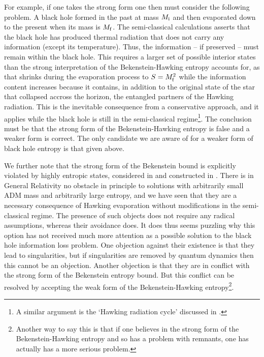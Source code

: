 \documentclass[12pt]{article}
\begin{document}
For example, if  one takes the strong form one then must consider the following problem.  A black hole formed in the past at mass $M_{\rm i}$ and then evaporated down to the present when its mass is $M_{\rm f}$. The semi-classical calculations asserts that the black hole has produced thermal radiation 
that does not carry any information (except its temperature). Thus, the 
information -- if preserved -- must remain within the black hole.  This requires a  larger set of possible interior states than the strong 
interpretation of the Bekenstein-Hawking entropy accounts for, as that  shrinks during the evaporation process to $S = M_{\rm f}^2$ while
the information content increases because it contains, in addition to the original state of the star that collapsed accross the horizon, the entangled partners of the Hawking radiation.  This is the inevitable consequence from a conservative
approach, and it applies while the black hole is still in the semi-classical regime\footnote{A similar argument is the `Hawking radiation cycle' discussed in \cite{Marolf:2008tx}.}.  The conclusion must be that the strong form of the Bekenstein-Hawking entropy is false and a weaker form is correct.  The only candidate we are aware of for a weaker form of black hole entropy is that given above. 

We further note that the strong form of the Bekenstein bound is explicitly violated by highly entropic states, considered in \cite{Marolf:2003wu} and  constructed in \cite{Hsu:2007dr}. There is in General Relativity no obstacle in
principle to solutions with arbitrarily small ADM mass and arbitrarily large entropy, and we have seen that they are
a necessary consequence of Hawking evaporation without modifications in the semi-classical regime. The presence of such objects does not
require any radical assumptions, whereas their avoidance does. It does thus seems puzzling why this option has
not received much more attention as a possible solution to the black hole information loss problem. One objection against
their existence is that they lead to singularities, but if singularities are removed by quantum dynamics then this cannot be an objection.
Another objection is that 
they are in conflict with the strong form of the Bekenstein entropy bound. But this conflict can be resolved by accepting the weak form of the Bekenstein-Hawking entropy\footnote{Another way to say this is that if one believes in the strong form of the Bekenstein-Hawking entropy and so has a problem with remnants, one has actually has a more serious problem.}. 
\end{document}

